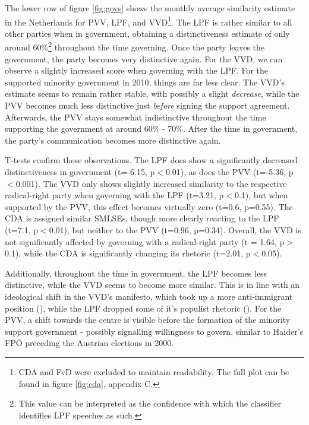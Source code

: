 \documentclass{article}
\begin{document}
The lower row of figure \ref{fig:govs} shows the monthly average similarity estimate in the Netherlands for PVV, LPF, and VVD\footnote{CDA and FvD were excluded to maintain readability. The full plot can be found in figure \ref{fig:cda}, appendix C.}. The LPF is rather similar to all other parties when in government, obtaining a distinctiveness estimate of only around 60\%\footnote{This value can be interpreted as the confidence with which the classifier identifies LPF speeches as such.} throughout the time governing. Once the party leaves the government, the party becomes very distinctive again. For the VVD, we can observe a slightly increased score when governing with the LPF. For the supported minority government in 2010, things are far less clear. The VVD's estimate seems to remain rather stable, with possibly a slight \textit{decrease}, while the PVV becomes much less distinctive just \textit{before} signing the support agreement. Afterwards, the PVV stays somewhat indistinctive throughout the time supporting the government at around 60\% - 70\%. After the time in government, the party's communication becomes more distinctive again.\par

T-tests confirm these observations. The LPF does show a significantly decreased distinctiveness in government (t=-6.15, p$<$0.01), as does the PVV (t=-5.36, p$<$0.001). The VVD only shows slightly increased similarity to the respective radical-right party when governing with the LPF (t=3.21, p$<$0.1), but when supported by the PVV, this effect becomes virtually zero (t=0.6, p=0.55). The CDA is assigned similar SMLSEs, though more clearly reacting to the LPF (t=7.1, p$<$0.01), but neither to the PVV (t=0.96, p=0.34). Overall, the VVD is not significantly affected by governing with a radical-right party (t = 1.64, p$>$0.1), while the CDA is significantly changing its rhetoric (t=2.01, p$<$0.05).\par

Additionally, throughout the time in government, the LPF becomes less distinctive, while the VVD seems to become more similar. This is in line with an ideological shift in the VVD's manifesto, which took up a more anti-immigrant position (\cite{Pennings2003}), while the LPF dropped some of it's populist rhetoric (\cite{Lucardie2007LPF}). For the PVV, a shift towards the centre is visible before the formation of the minority support government - possibly signalling willingness to govern, similar to Haider's FPÖ preceding the Austrian elections in 2000.\par
\end{document}
